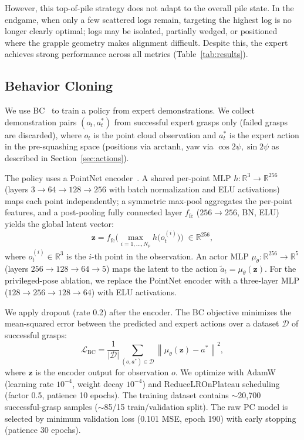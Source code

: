 \documentclass[conference]{IEEEtran}
\begin{document}
However, this top-of-pile strategy does not adapt to the overall pile state.
In the endgame, when only a few scattered logs remain, targeting the highest log is no longer clearly optimal; logs may be isolated, partially wedged, or positioned where the grapple geometry makes alignment difficult.
Despite this, the expert achieves strong performance across all metrics (Table~\ref{tab:results}).

\subsection{Behavior Cloning}
\label{sec:bc}
We use BC~\cite{pomerleau1988alvinn} to train a policy from expert demonstrations.
We collect demonstration pairs $(o_t, a_t^*)$ from successful expert grasps only (failed grasps are discarded), where $o_t$ is the point cloud observation and $a_t^*$ is the expert action in the pre-squashing space (positions via $\mathrm{arctanh}$, yaw via $\cos 2\psi, \sin 2\psi$ as described in Section~\ref{sec:actions}).

The policy uses a PointNet encoder~\cite{qi2017pointnet}.
A shared per-point MLP $h: \mathbb{R}^3 \to \mathbb{R}^{256}$ (layers $3 \!\to\! 64 \!\to\! 128 \!\to\! 256$ with batch normalization and ELU activations) maps each point independently; a symmetric max-pool aggregates the per-point features, and a post-pooling fully connected layer $f_{\mathrm{fc}}$ ($256 \!\to\! 256$, BN, ELU) yields the global latent vector:
\begin{equation}
    \mathbf{z} = f_{\mathrm{fc}}\!\Big(\max_{i=1,\ldots,N_p} h\!\big(o_t^{(i)}\big)\Big) \;\in \mathbb{R}^{256},
\end{equation}
where $o_t^{(i)} \in \mathbb{R}^3$ is the $i$-th point in the observation.
An actor MLP $\mu_\theta: \mathbb{R}^{256} \to \mathbb{R}^{5}$ (layers $256 \!\to\! 128 \!\to\! 64 \!\to\! 5$) maps the latent to the action $\tilde{a}_t = \mu_\theta(\mathbf{z})$.
For the privileged-pose ablation, we replace the PointNet encoder with a three-layer MLP ($128 \!\to\! 256 \!\to\! 128 \!\to\! 64$) with ELU activations.

We apply dropout (rate 0.2) after the encoder.
The BC objective minimizes the mean-squared error between the predicted and expert actions over a dataset $\mathcal{D}$ of successful grasps:
\begin{equation}
    \mathcal{L}_{\text{BC}} = \frac{1}{|\mathcal{D}|}\sum_{(o,a^*)\in\mathcal{D}} \left\| \mu_\theta(\mathbf{z}) - a^* \right\|^2,
\end{equation}
where $\mathbf{z}$ is the encoder output for observation $o$.
We optimize with AdamW~\cite{loshchilov2019adamw} (learning rate $10^{-4}$, weight decay $10^{-4}$) and ReduceLROnPlateau scheduling (factor 0.5, patience 10 epochs).
The training dataset contains $\sim$20{,}700 successful-grasp samples ($\sim$85/15 train/validation split). The raw PC model is selected by minimum validation loss (0.101 MSE, epoch 190) with early stopping (patience 30 epochs).
\end{document}
